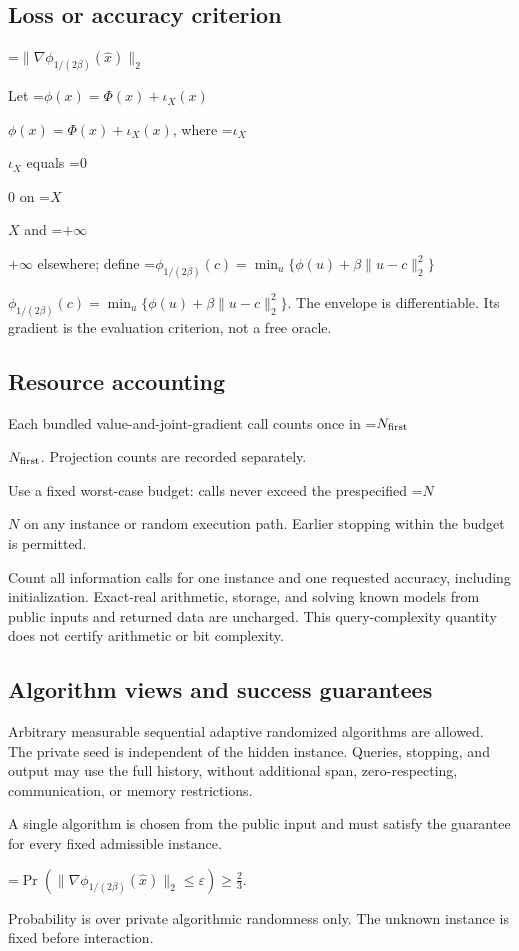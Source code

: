 \documentclass[10pt,a4paper]{article}
\newcommand{\AtlasMath}[1]{\par\begingroup\centering\setbox0=\hbox{$\displaystyle #1$}\ifdim\wd0>1.4\linewidth\typeout{ATLAS WIDE FORMULA: \the\wd0}\fi\ifdim\wd0>\linewidth\resizebox{\linewidth}{!}{\box0}\else\box0\fi\par\endgroup}
\newcommand{\AtlasInlineMath}[1]{\begingroup\setbox0=\hbox{$#1$}\ifdim\wd0>.4\linewidth\endgroup\AtlasMath{#1}\else\endgroup$#1$\fi}
\begin{document}
\subsection{Loss or accuracy criterion}

\AtlasMath{\|\nabla\phi_{1/(2\beta)}(\widehat{x})\|_2}


Let \AtlasInlineMath{\phi(x)=\Phi(x)+\iota_X(x)}, where \AtlasInlineMath{\iota_X} equals \AtlasInlineMath{0} on \AtlasInlineMath{X} and \AtlasInlineMath{+\infty} elsewhere; define \AtlasInlineMath{\phi_{1/(2\beta)}(c)=\min_u\{\phi(u)+\beta\|u-c\|_2^2\}}. The envelope is differentiable. Its gradient is the evaluation criterion, not a free oracle.

\subsection{Resource accounting}
Each bundled value-and-joint-gradient call counts once in \AtlasInlineMath{N_{\rm first}}. Projection counts are recorded separately.

Use a fixed worst-case budget: calls never exceed the prespecified \AtlasInlineMath{N} on any instance or random execution path. Earlier stopping within the budget is permitted.

Count all information calls for one instance and one requested accuracy, including initialization. Exact-real arithmetic, storage, and solving known models from public inputs and returned data are uncharged. This query-complexity quantity does not certify arithmetic or bit complexity.

\subsection{Algorithm views and success guarantees}
Arbitrary measurable sequential adaptive randomized algorithms are allowed. The private seed is independent of the hidden instance. Queries, stopping, and output may use the full history, without additional span, zero-respecting, communication, or memory restrictions.

A single algorithm is chosen from the public input and must satisfy the guarantee for every fixed admissible instance.


\AtlasMath{\Pr\!\left(\|\nabla\phi_{1/(2\beta)}(\widehat{x})\|_2\le\varepsilon\right)\ge\frac23.}


Probability is over private algorithmic randomness only. The unknown instance is fixed before interaction.
\end{document}
